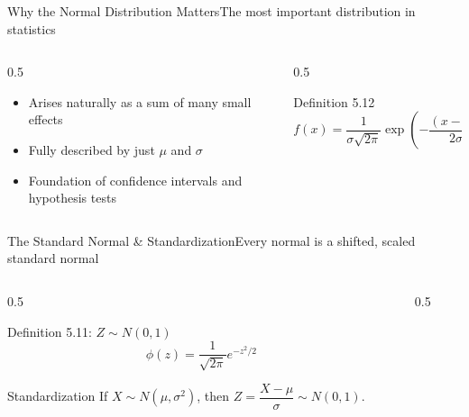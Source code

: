 \documentclass[aspectratio=169,11pt]{beamer}
\begin{document}
\begin{frame}{Why the Normal Distribution Matters}{The most important distribution in statistics}
  \begin{columns}[T]
    \begin{column}{0.5\textwidth}
      \begin{itemize}\small
        \item Arises naturally as a sum of many small effects
        \item Fully described by just $\mu$ and $\sigma$
        \item Foundation of confidence intervals and hypothesis tests
      \end{itemize}
    \end{column}
    \begin{column}{0.5\textwidth}
      \begin{block}{Definition 5.12}
        \[ f(x) = \frac{1}{\sigma\sqrt{2\pi}}\exp\!\left(-\frac{(x-\mu)^2}{2\sigma^2}\right) \]
      \end{block}
    \end{column}
  \end{columns}
\end{frame}

\begin{frame}{The Standard Normal \& Standardization}{Every normal is a shifted, scaled standard normal}
  \begin{columns}[T]
    \begin{column}{0.5\textwidth}
      \begin{block}{Definition 5.11: $Z \sim N(0,1)$}
        \[ \phi(z) = \frac{1}{\sqrt{2\pi}}e^{-z^2/2} \]
      \end{block}
      \begin{exampleblock}{Standardization}
        \small If $X\sim N(\mu,\sigma^2)$, then $Z=\dfrac{X-\mu}{\sigma}\sim N(0,1)$.
      \end{exampleblock}
    \end{column}
    \begin{column}{0.5\textwidth}
      \centering
    \end{column}
  \end{columns}
\end{frame}
\end{document}
